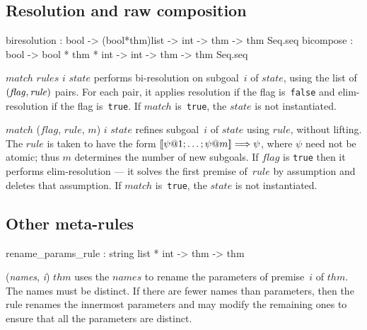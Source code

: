 \subsection{Resolution and raw composition}
\begin{ttbox} 
biresolution : bool -> (bool*thm)list -> int -> thm
               -> thm Seq.seq
bicompose : bool -> bool * thm * int -> int -> thm
            -> thm Seq.seq
\end{ttbox}
\begin{ttdescription}
\item[\ttindexbold{biresolution} $match$ $rules$ $i$ $state$] 
performs bi-resolution on subgoal~$i$ of $state$, using the list of $\it
(flag,rule)$ pairs.  For each pair, it applies resolution if the flag
is~{\tt false} and elim-resolution if the flag is~{\tt true}.  If $match$
is~{\tt true}, the $state$ is not instantiated.

\item[\ttindexbold{bicompose} $match$ ($flag$, $rule$, $m$) $i$ $state$]
refines subgoal~$i$ of $state$ using $rule$, without lifting.  The $rule$
is taken to have the form $\List{\psi@1; \ldots; \psi@m} \Imp \psi$, where
$\psi$ need not be atomic; thus $m$ determines the number of new
subgoals.  If $flag$ is {\tt true} then it performs elim-resolution --- it
solves the first premise of~$rule$ by assumption and deletes that
assumption.  If $match$ is~{\tt true}, the $state$ is not instantiated.
\end{ttdescription}


\subsection{Other meta-rules}
\begin{ttbox} 
rename_params_rule : string list * int -> thm -> thm
\end{ttbox}
\begin{ttdescription}

\item[\ttindexbold{rename_params_rule} ({\it names}, {\it i}) $thm$] 
uses the $names$ to rename the parameters of premise~$i$ of $thm$.  The
names must be distinct.  If there are fewer names than parameters, then the
rule renames the innermost parameters and may modify the remaining ones to
ensure that all the parameters are distinct.

\end{ttdescription}


